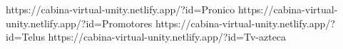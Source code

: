 https://cabina-virtual-unity.netlify.app/?id=Pronico
https://cabina-virtual-unity.netlify.app/?id=Promotores
https://cabina-virtual-unity.netlify.app/?id=Telus
https://cabina-virtual-unity.netlify.app/?id=Tv-azteca